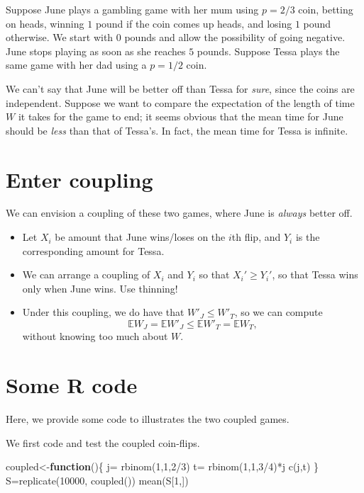\documentclass[
]{article}
\newenvironment{Shaded}{\begin{snugshade}}{\end{snugshade}}
\newcommand{\ControlFlowTok}[1]{\textcolor[rgb]{0.13,0.29,0.53}{\textbf{#1}}}
\newcommand{\DecValTok}[1]{\textcolor[rgb]{0.00,0.00,0.81}{#1}}
\newcommand{\FunctionTok}[1]{\textcolor[rgb]{0.00,0.00,0.00}{#1}}
\newcommand{\NormalTok}[1]{#1}
\newcommand{\OtherTok}[1]{\textcolor[rgb]{0.56,0.35,0.01}{#1}}
\newcommand{\SpecialCharTok}[1]{\textcolor[rgb]{0.00,0.00,0.00}{#1}}
\theoremstyle{definition}
\theoremstyle{definition}
\theoremstyle{definition}
\theoremstyle{remark}
\begin{document}
Suppose June plays a gambling game with her mum using \(p=2/3\) coin, betting on heads, winning \(1\) pound if the coin comes up heads, and losing \(1\) pound otherwise. We start with \(0\) pounds and allow the possibility of going negative. June stops playing as soon as she reaches \(5\) pounds. Suppose Tessa plays the same game with her dad using a \(p=1/2\) coin.

We can't say that June will be better off than Tessa for \emph{sure}, since the coins are independent. Suppose we want to compare the expectation of the length of time \(W\) it takes for the game to end; it seems obvious that the mean time for June should be \emph{less} than that of Tessa's. In fact, the mean time for Tessa is infinite.

\hypertarget{enter-coupling}{%
\section{Enter coupling}\label{enter-coupling}}

We can envision a coupling of these two games, where June is \emph{always} better off.

\begin{itemize}
\item
  Let \(X_i\) be amount that June wins/loses on the \(i\)th flip, and \(Y_i\) is the corresponding amount for Tessa.
\item
  We can arrange a coupling of \(X_i\) and \(Y_i\) so that \(X_i' \geq Y_i'\), so that Tessa wins only when June wins. Use thinning!
\item
  Under this coupling, we do have that \(W'_J \leq W'_T\), so we can compute
  \[\mathbb{E} W_J = \mathbb{E} W'_J \leq \mathbb{E}  W'_T = \mathbb{E} W_T,\] without knowing too much about \(W\).
\end{itemize}

\hypertarget{some-r-code}{%
\section{Some R code}\label{some-r-code}}

Here, we provide some code to illustrates the two coupled games.

We first code and test the coupled coin-flips.

\begin{Shaded}
\begin{Highlighting}[]
\NormalTok{coupled}\OtherTok{\textless{}{-}}\ControlFlowTok{function}\NormalTok{()\{}
\NormalTok{  j}\OtherTok{=} \FunctionTok{rbinom}\NormalTok{(}\DecValTok{1}\NormalTok{,}\DecValTok{1}\NormalTok{,}\DecValTok{2}\SpecialCharTok{/}\DecValTok{3}\NormalTok{)}
\NormalTok{  t}\OtherTok{=} \FunctionTok{rbinom}\NormalTok{(}\DecValTok{1}\NormalTok{,}\DecValTok{1}\NormalTok{,}\DecValTok{3}\SpecialCharTok{/}\DecValTok{4}\NormalTok{)}\SpecialCharTok{*}\NormalTok{j}
\FunctionTok{c}\NormalTok{(j,t)}
\NormalTok{\}}
\NormalTok{S}\OtherTok{=}\FunctionTok{replicate}\NormalTok{(}\DecValTok{10000}\NormalTok{, }\FunctionTok{coupled}\NormalTok{())}
\FunctionTok{mean}\NormalTok{(S[}\DecValTok{1}\NormalTok{,])}
\end{Highlighting}
\end{Shaded}
\end{document}
